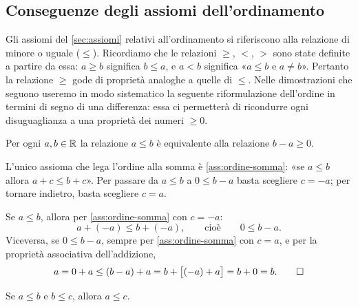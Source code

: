 \subsection{Conseguenze degli assiomi dell'ordinamento}

Gli assiomi del \cref{sec:assiomi} relativi all'ordinamento si riferiscono alla
relazione di minore o uguale ($\le$). Ricordiamo che le relazioni $\ge$, $<$, $>$ sono
state definite a partire da essa: $a\ge b$ significa $b\le a$, e $a<b$ significa
«$a\le b$ e $a\neq b$». Pertanto la relazione $\ge$ gode di proprietà analoghe a quelle
di $\le$. Nelle dimostrazioni che seguono useremo in modo sistematico la seguente
riformulazione dell'ordine in termini di segno di una differenza: essa ci permetterà
di ricondurre ogni disuguaglianza a una proprietà dei numeri $\ge0$.

\begin{proposizione}\label{prop:ordine-differenza}
Per ogni $a,b\in\mathbb{R}$ la relazione $a\le b$ è equivalente alla relazione $b-a\ge0$.
\end{proposizione}

\begin{schema}
\end{schema}

\begin{strategia}
L'unico assioma che lega l'ordine alla somma è \ref{ass:ordine-somma}: «se $a\le b$
allora $a+c\le b+c$». Per passare da $a\le b$ a $0\le b-a$ basta scegliere $c=-a$; per
tornare indietro, basta scegliere $c=a$.
\end{strategia}

\begin{dimostrazione}
Se $a\le b$, allora per \ref{ass:ordine-somma} con $c=-a$:
\[
  a+(-a)\le b+(-a), \qquad\text{cioè}\qquad 0\le b-a .
\]
Viceversa, se $0\le b-a$, sempre per \ref{ass:ordine-somma} con $c=a$, e per la
proprietà associativa dell'addizione,
\[
  a = 0+a \le (b-a)+a = b+\bigl[(-a)+a\bigr] = b+0 = b. \qedhere
\]
\end{dimostrazione}

\begin{proposizione}\label{prop:transitiva}
Se $a\le b$ e $b\le c$, allora $a\le c$.
\end{proposizione}

\begin{schema}
\end{schema}

